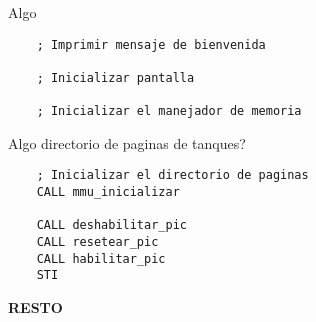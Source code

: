 Algo
\begin{codesnippet}
\begin{verbatim}
    ; Imprimir mensaje de bienvenida

    ; Inicializar pantalla
    
    ; Inicializar el manejador de memoria
\end{verbatim}
\end{codesnippet}

Algo
directorio de paginas de tanques?
\begin{codesnippet}
\begin{verbatim}
    ; Inicializar el directorio de paginas
    CALL mmu_inicializar
    
    CALL deshabilitar_pic
    CALL resetear_pic
    CALL habilitar_pic
    STI
\end{verbatim}
\end{codesnippet}

\textbf{RESTO}
